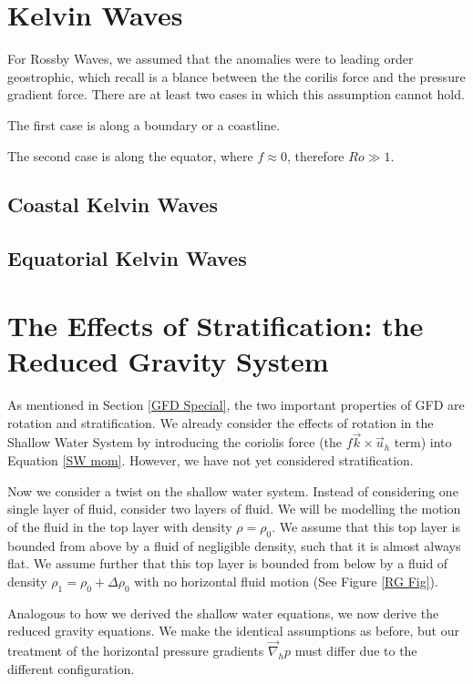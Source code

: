 \section{Kelvin Waves}

For Rossby Waves, we assumed that the anomalies were to leading order geostrophic, which recall is a blance between the the corilis force and the pressure gradient force. There are at least two cases in which this assumption cannot hold.

The first case is along a boundary or a coastline.

The second case is along the equator, where $f\approx 0$, therefore $Ro \gg 1$. 

\subsection{Coastal Kelvin Waves}

\subsection{Equatorial Kelvin Waves}

\section{The Effects of Stratification: the Reduced Gravity System}

As mentioned in Section \ref{GFD Special}, the two important properties of GFD are rotation and stratification. We already consider the effects of rotation in the Shallow Water System by introducing the coriolis force (the $f\vec{k}\times\vec{u}_h$ term) into Equation \ref{SW mom}. However, we have not yet considered stratification.

Now we consider a twist on the shallow water system. Instead of considering one single layer of fluid, consider two layers of fluid. We will be modelling the motion of the fluid in the top layer with density $\rho=\rho_0$. We assume that this top layer is bounded from above by a fluid of negligible density, such that it is almost always flat. We assume further that this top layer is bounded from below by a fluid of density $\rho_1=\rho_0+\Delta \rho_0$ with no horizontal fluid motion (See Figure \ref{RG Fig}).

Analogous to how we derived the shallow water equations, we now derive the reduced gravity equations. We make the identical assumptions as before, but our treatment of the horizontal pressure gradients $\vec{\nabla}_h p$ must differ due to the different configuration.

